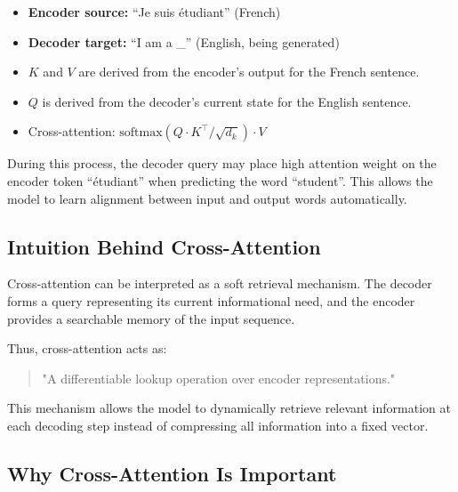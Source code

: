\documentclass[11pt]{article}
\begin{document}
\begin{examplebox}

\begin{itemize}[nosep]

\item \textbf{Encoder source:} ``Je suis étudiant'' (French)

\item \textbf{Decoder target:} ``I am a \_'' (English, being generated)

\item $K$ and $V$ are derived from the encoder's output for the French sentence.

\item $Q$ is derived from the decoder's current state for the English sentence.

\item Cross-attention:
$\text{softmax}(Q \cdot K^\top / \sqrt{d_k}) \cdot V$

\end{itemize}

\end{examplebox}

During this process, the decoder query may place high attention weight on the encoder token ``étudiant'' when predicting the word ``student''. This allows the model to learn alignment between input and output words automatically.

\subsection{Intuition Behind Cross-Attention}

Cross-attention can be interpreted as a soft retrieval mechanism. The decoder forms a query representing its current informational need, and the encoder provides a searchable memory of the input sequence.

Thus, cross-attention acts as:

\begin{quote}
"A differentiable lookup operation over encoder representations."
\end{quote}

This mechanism allows the model to dynamically retrieve relevant information at each decoding step instead of compressing all information into a fixed vector.

\subsection{Why Cross-Attention Is Important}
\end{document}
